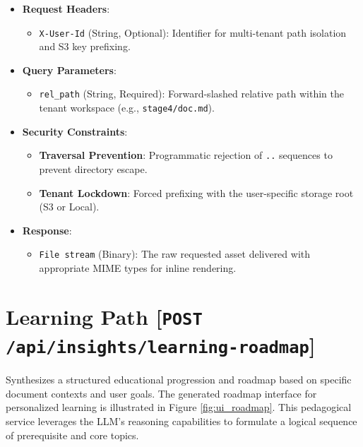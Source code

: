 \begin{itemize}
    \item \textbf{Request Headers}:
    \begin{itemize}
        \item \texttt{X-User-Id} (String, Optional): Identifier for multi-tenant path isolation and S3 key prefixing.
    \end{itemize}
    \item \textbf{Query Parameters}:
    \begin{itemize}
        \item \texttt{rel\_path} (String, Required): Forward-slashed relative path within the tenant workspace (e.g., \texttt{stage4/doc.md}).
    \end{itemize}
    \item \textbf{Security Constraints}: 
    \begin{itemize}
        \item \textbf{Traversal Prevention}: Programmatic rejection of \texttt{..} sequences to prevent directory escape.
        \item \textbf{Tenant Lockdown}: Forced prefixing with the user-specific storage root (S3 or Local).
    \end{itemize}
    \item \textbf{Response}:
    \begin{itemize}
        \item \texttt{File stream} (Binary): The raw requested asset delivered with appropriate MIME types for inline rendering.
    \end{itemize}
\end{itemize}

\section*{Learning Path [\texttt{POST} \texttt{/api/insights/learning-roadmap}]}
Synthesizes a structured educational progression and roadmap based on specific document contexts and user goals. The generated roadmap interface for personalized learning is illustrated in Figure \ref{fig:ui_roadmap}. This pedagogical service leverages the LLM's reasoning capabilities to formulate a logical sequence of prerequisite and core topics.

